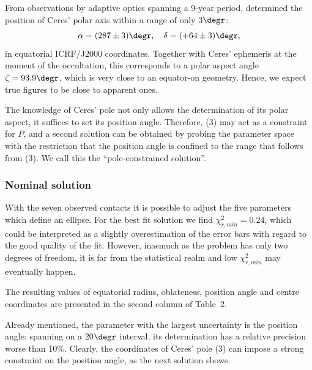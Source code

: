 \documentclass[useAMS,usenatbib]{mn2e}
\begin{document}
From observations by adaptive optics spanning a 9-year period, \cite{Drummond2014} determined the position of Ceres' polar axis within a range of only 3$\degr$:
\begin{equation}
\alpha = (287 \pm 3) \degr, \quad %
\delta = (+64 \pm 3) \degr,
\end{equation}
%
in equatorial ICRF/J2000 coordinates. Together with Ceres' ephemeris at the moment of the occultation, this corresponds to a polar aspect angle $\zeta = 93.9\degr$, which is very close to an equator-on geometry. Hence, we expect true figures to be close to apparent ones.

The knowledge of Ceres' pole not only allows the determination of its polar aspect, it suffices to set its position angle. Therefore, (3) may act as a constraint for $P$, and a second solution can be obtained by probing the parameter space with the restriction that the position angle is confined to the range that follows from (3). We call this the ``pole-constrained solution''.


\subsubsection{Nominal solution}

With the seven observed contacts it is possible to adjust the five parameters which define an ellipse. For the best fit solution we find $\chi^2_{r,min} = 0.24$, which could be interpreted as a slightly overestimation of the error bars with regard to the good quality of the fit. However, inasmuch as the problem has only two degrees of freedom, it is far from the statistical realm and low $\chi^2_{r,min}$ may eventually happen.

The resulting values of equatorial radius, oblateness, position angle and centre coordinates are presented in the second column of Table~2.%

Already mentioned, the parameter with the largest uncertainty is the position angle: spanning on a 20$\degr$ interval, its determination has a relative precision worse than 10$\%$. Clearly, the coordinates of Ceres' pole (3) can impose a strong constraint on the position angle, as the next solution shows.
\end{document}
